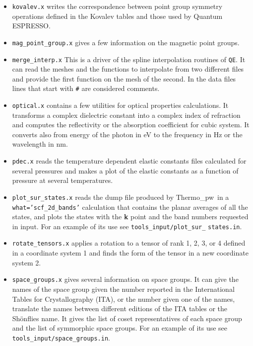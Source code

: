 \documentclass[12pt,a4paper,twoside]{report}
\def\qe{{\sc Quantum ESPRESSO}}
\def\thermo{{\sc Thermo}\_{\sc pw}}
\begin{document}
\begin{itemize}
\item \texttt{kovalev.x} writes the correspondence between point group
symmetry operations defined in the Kovalev tables and those used by \qe.

\item \texttt{mag\_point\_group.x} gives a few information on the magnetic point
groups.

\item \texttt{merge\_interp.x} This is a driver of the spline
interpolation routines of \texttt{QE}. It can read the meshes and the
functions to interpolate from two different files and provide the
first function on the mesh of the second. In the data files
lines that start with \texttt{\#} are considered comments.

\item \texttt{optical.x} contains a few utilities for
optical properties calculations. It transforms a complex dielectric 
constant into a complex index of refraction and computes the reflectivity 
or the absorption coefficient for cubic system. It converts also from 
energy of the photon in eV to the frequency in Hz or the wavelength in nm.

\item \texttt{pdec.x} reads the temperature dependent elastic constants files 
calculated for several pressures and makes a plot of the elastic constants as
a function of pressure at several temperatures.

\item \texttt{plot\_sur\_states.x} reads the dump file produced
by \thermo\ in a \texttt{what='scf\_2d\_bands'} calculation that
contains the planar averages of all the states, and plots
the states with the {\bf k} point and the band numbers requested in input.
For an example of its use see \texttt{tools\_input/plot\_sur\_}
\texttt{states.in}.

\item \texttt{rotate\_tensors.x} applies a rotation to a tensor
of rank 1, 2, 3, or 4 defined in a coordinate system 1 and finds the form
of the tensor in a new coordinate system 2. 

\item \texttt{space\_groups.x} gives several information on space groups.
It can give the names of the space group given the number reported in
the International Tables for Crystallography (ITA), or
the number given one of the names, translate the names between different
editions of the ITA tables or the Sh\"onflies name. It gives the list 
of coset representatives of each space group and the list of symmorphic 
space groups.
For an example of its use see \texttt{tools\_input/space\_groups.in}.


\end{itemize}
\end{document}
